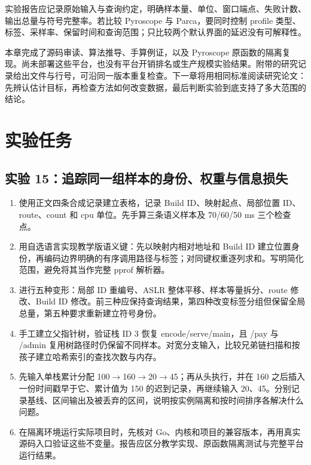 \documentclass[UTF8,fontset=fandol,openany,11pt]{ctexbook}
\begin{document}
实验报告应记录原始输入与查询约定，明确样本量、单位、窗口端点、失败计数、输出总量与符号完整率。若比较 Pyroscope 与 Parca，要同时控制 profile 类型、标签、采样率、保留时间和查询范围；只比较两个默认界面的延迟没有可解释性。

本章完成了源码审读、算法推导、手算例证，以及 Pyroscope 原函数的隔离复现。尚未部署这些平台，也没有平台开销排名或生产规模实验结果。附带的研究记录给出文件与行号，可沿同一版本重复检查。下一章将用相同标准阅读研究论文：先辨认估计目标，再检查方法如何改变数据，最后判断实验到底支持了多大范围的结论。

\section{实验任务}
\subsection*{实验 15：追踪同一组样本的身份、权重与信息损失}
\begin{enumerate}
\item 使用正文四条合成记录建立表格，记录 Build ID、映射起点、局部位置 ID、route、count 和 cpu 单位。先手算三条语义样本及 70/60/50 ms 三个检查点。

\item 用自选语言实现教学版语义键：先以映射内相对地址和 Build ID 建立位置身份，再编码边界明确的有序调用路径与标签；对同键权重逐列求和。写明简化范围，避免将其当作完整 pprof 解析器。

\item 进行五种变形：局部 ID 重编号、ASLR 整体平移、样本等量拆分、route 修改、Build ID 修改。前三种应保持查询结果，第四种改变标签分组但保留全局总量，第五种要求重新建立符号身份。

\item 手工建立父指针树，验证栈 ID 3 恢复 encode/serve/main，且 /pay 与 /admin 复用树路径时仍保留不同样本。对宽分支输入，比较兄弟链扫描和按孩子建立哈希索引的查找次数与内存。

\item 先输入单栈累计分配 100\ensuremath{\rightarrow}\allowbreak{}160\ensuremath{\rightarrow}\allowbreak{}20\ensuremath{\rightarrow}\allowbreak{}45；再从头执行，并在 160 之后插入一份时间戳早于它、累计值为 150 的迟到记录，再继续输入 20、45。分别记录基线、区间输出及被丢弃的区间，说明按实例隔离和按时间排序各解决什么问题。

\item 在隔离环境运行实际项目时，先核对 Go、内核和项目的兼容版本，再用真实源码入口验证这些不变量。报告应区分教学实现、原函数隔离测试与完整平台运行结果。

\end{enumerate}
\end{document}
